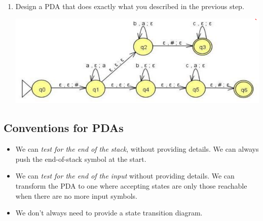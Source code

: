 \documentclass[letterpaper]{article}
\begin{document}
\begin{enumerate}
    \item Design a PDA that does exactly what you described in the previous step. 
    \begin{mdframed}[nobreak=true]
        \begin{center}
            \includegraphics[scale=0.6]{../assets/pda_2.png}
        \end{center}
    \end{mdframed}
\end{enumerate}

\subsection{Conventions for PDAs}
\begin{itemize}
    \item We can \emph{test for the end of the stack}, without providing details. We can always push the end-of-stack symbol \code{\$} at the start. 
    \item We can \emph{test for the end of the input} without providing details. We can transform the PDA to one where accepting states are only those reachable when there are no more input symbols. 
    \item We don't always need to provide a state transition diagram.
\end{itemize}
\end{document}

